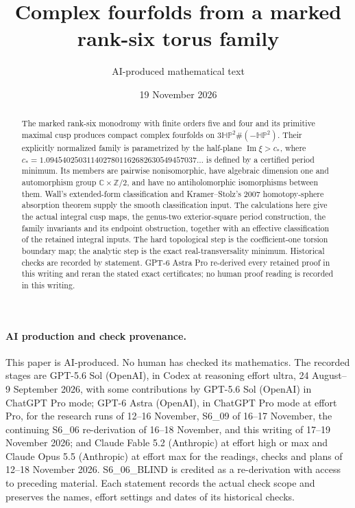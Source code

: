 \documentclass[11pt,a4paper]{article}
\theoremstyle{definition}
\begin{document}
\title{Complex fourfolds from a marked rank-six torus family}
\author{AI-produced mathematical text}
\date{19 November 2026}
\maketitle

\begin{abstract}
The marked rank-six monodromy with finite orders five and four and its
primitive maximal cusp produces compact complex fourfolds on
$3\mathbb{HP}^2\#(-\mathbb{HP}^2)$. Their explicitly normalized family
is parametrized by the half-plane $\operatorname{Im}\xi>c_*$, where
$c_*=1.0945402503114027801162682630549457037\ldots$ is defined by
a certified period minimum. Its members are pairwise nonisomorphic,
have algebraic dimension one and automorphism group
$\mathbb C\times\mathbb Z/2$, and have no antiholomorphic
isomorphisms between them. Wall's extended-form classification and
Kramer--Stolz's 2007 homotopy-sphere absorption theorem supply the
smooth classification input. The calculations here give the actual
integral cusp maps, the genus-two exterior-square period construction,
the family invariants and its endpoint obstruction, together with an
effective classification of the retained integral inputs. The hard
topological step is the coefficient-one torsion boundary map; the
analytic step is the exact real-transversality minimum. Historical
checks are recorded by statement. GPT-6 Astra Pro re-derived every
retained proof in this writing and reran the stated exact certificates;
no human proof reading is recorded in this writing.
\end{abstract}
\paragraph{AI production and check provenance.}
This paper is AI-produced. No human has checked its mathematics.
The recorded stages are GPT-5.6 Sol (OpenAI), in Codex at reasoning
effort ultra, 24 August--9 September 2026, with some contributions by
GPT-5.6 Sol (OpenAI) in ChatGPT Pro mode; GPT-6 Astra (OpenAI), in
ChatGPT Pro mode at effort Pro, for the research runs of 12--16
November, S6\_09 of 16--17 November, the continuing S6\_06 re-derivation
of 16--18 November, and this writing of 17--19 November 2026;
and Claude Fable 5.2 (Anthropic)
at effort high or max and Claude Opus 5.5 (Anthropic) at effort max
for the readings, checks and plans of 12--18 November 2026.
S6\_06\_BLIND is credited as a re-derivation with access to preceding
material. Each statement records the actual check scope and preserves
the names, effort settings and dates of its historical checks.
\end{document}
